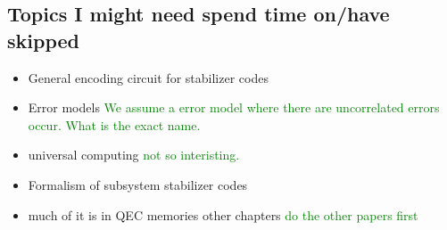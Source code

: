 \subsection{Topics I might need spend time on/have skipped}
\begin{itemize}
    \item General encoding circuit for stabilizer codes
    \item Error models \textcolor{green}{We assume a error model where there are uncorrelated errors occur. What is the exact name.}
    \item universal computing  \textcolor{green}{not so interisting.}
    \item Formalism of subsystem stabilizer codes
    \item much of it is in QEC memories other chapters \textcolor{green}{do the other papers first}
\end{itemize}